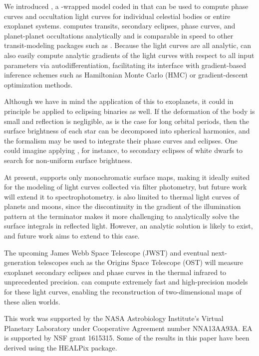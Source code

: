 \documentclass[modern]{aastex61}
\begin{document}
We introduced \starry, a \Python-wrapped model coded in \cpp
that can be used to compute phase curves and occultation light curves for
individual celestial bodies or entire exoplanet systems. \starry computes
transits, secondary eclipses, phase curves, and planet-planet occultations
analytically and is comparable in speed to other transit-modeling packages such
as \batman \citep{Kreidberg2015}. Because the light curves are all analytic,
\starry can also easily compute analytic gradients of the light curves with respect
to all input parameters via autodifferentiation, facilitating its interface with
gradient-based inference schemes such as Hamiltonian Monte Carlo (HMC)
or gradient-descent optimization methods.

Although we have in mind the application of this \starry to exoplanets, it could
in principle be applied to eclipsing binaries as well.  If the deformation of
the body is small and reflection is negligible, as is the case for long orbital periods,
then the surface brightness of each star can be decomposed into spherical harmonics,
and the \starry formalism may be used to integrate their phase curves and eclipses.
One could imagine applying \starry, for instance, to secondary eclipses of white
dwarfs to search for non-uniform surface brightness.

At present, \starry supports only
monochromatic surface maps, making it ideally suited for the modeling of
light curves collected via filter photometry, but future work will extend
it to spectrophotometry. \starry is also limited to thermal light curves of
planets and moons, since the discontinuity in the gradient of the
illumination pattern at the terminator makes it more challenging to analytically
solve the surface integrals in reflected light. However, an analytic solution
is likely to exist, and future work aims to extend \starry to this case.

The upcoming James Webb Space Telescope (JWST) and eventual
next-generation telescopes such as the Origins Space Telescope (OST) will
measure exoplanet secondary eclipses and
phase curves in the thermal infrared to unprecedented precision. \starry
can compute extremely fast and high-precision models for these
light curves, enabling the reconstruction of two-dimensional maps of these
alien worlds.


\acknowledgments
This work was supported by the NASA Astrobiology
Institute's Virtual Planetary Laboratory under Cooperative
Agreement number NNA13AA93A.  EA is supported by NSF grant 1615315.
%
Some of the results in this paper have been derived using the HEALPix
\citep{Gorski2005} package.
\end{document}
